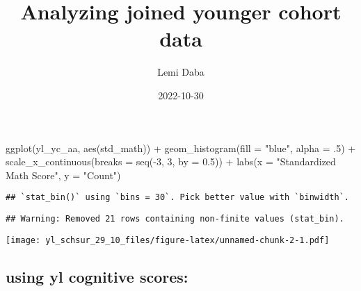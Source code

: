 \documentclass[
]{article}
\title{Analyzing joined younger cohort data}
\author{Lemi Daba}
\date{2022-10-30}
\newenvironment{Shaded}{\begin{snugshade}}{\end{snugshade}}
\newcommand{\AttributeTok}[1]{\textcolor[rgb]{0.77,0.63,0.00}{#1}}
\newcommand{\DecValTok}[1]{\textcolor[rgb]{0.00,0.00,0.81}{#1}}
\newcommand{\FloatTok}[1]{\textcolor[rgb]{0.00,0.00,0.81}{#1}}
\newcommand{\FunctionTok}[1]{\textcolor[rgb]{0.00,0.00,0.00}{#1}}
\newcommand{\NormalTok}[1]{#1}
\newcommand{\SpecialCharTok}[1]{\textcolor[rgb]{0.00,0.00,0.00}{#1}}
\newcommand{\StringTok}[1]{\textcolor[rgb]{0.31,0.60,0.02}{#1}}
\begin{document}
\maketitle

\begin{Shaded}
\begin{Highlighting}[]
\FunctionTok{ggplot}\NormalTok{(yl\_yc\_aa, }\FunctionTok{aes}\NormalTok{(std\_math)) }\SpecialCharTok{+}
  \FunctionTok{geom\_histogram}\NormalTok{(}\AttributeTok{fill =} \StringTok{"blue"}\NormalTok{, }\AttributeTok{alpha =}\NormalTok{ .}\DecValTok{5}\NormalTok{) }\SpecialCharTok{+}
  \FunctionTok{scale\_x\_continuous}\NormalTok{(}\AttributeTok{breaks =} \FunctionTok{seq}\NormalTok{(}\SpecialCharTok{{-}}\DecValTok{3}\NormalTok{, }\DecValTok{3}\NormalTok{, }\AttributeTok{by =} \FloatTok{0.5}\NormalTok{)) }\SpecialCharTok{+}
  \FunctionTok{labs}\NormalTok{(}\AttributeTok{x =} \StringTok{"Standardized Math Score"}\NormalTok{,}
       \AttributeTok{y =} \StringTok{"Count"}\NormalTok{)}
\end{Highlighting}
\end{Shaded}

\begin{verbatim}
## `stat_bin()` using `bins = 30`. Pick better value with `binwidth`.
\end{verbatim}

\begin{verbatim}
## Warning: Removed 21 rows containing non-finite values (stat_bin).
\end{verbatim}

\texttt{[image: yl\_schsur\_29\_10\_files/figure-latex/unnamed-chunk-2-1.pdf]}

\hypertarget{using-yl-cognitive-scores}{%
\subsection{using yl cognitive
scores:}\label{using-yl-cognitive-scores}}
\end{document}
